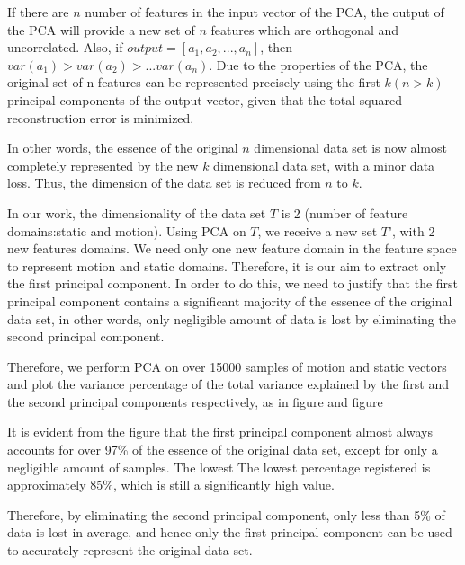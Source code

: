 If there are $n$ number of features in the input vector of the PCA, the output of the
PCA will provide a new set of $n$ features which are orthogonal and uncorrelated. Also, if
$output=[a_{1}, a_{2}, ..., a_{n}]$, then $var(a_{1})>var(a_{2})>...var(a_{n})$.
Due to the properties of the PCA, the original set of n features can be
represented precisely using the first $k(n>k)$ principal
components of the output vector, given that the total squared reconstruction error
is minimized.

In other words, the essence of the original $n$ dimensional data set is now almost
completely represented by the new $k$ dimensional data set, with a minor data loss. Thus, the
dimension of the data set is reduced from $n$ to $k$.


In our work, the dimensionality of the data set $T$ is 2 (number of feature domains:static
and motion).
Using PCA on $T$, we receive a new set $T’$, with 2 new features domains. We need only one new feature
domain in the feature space to
represent motion and static domains. Therefore, it is our aim to extract only the first principal component.
In order to do this, we need to justify that the first principal component contains a significant majority of
the essence of the original data set, in other words, only negligible amount of data is lost by
eliminating the second principal component.

Therefore, we perform PCA on over 15000 samples of motion and static
vectors and plot the variance percentage of the total variance
explained by the first and the second principal components respectively, as in figure and figure


It is evident from the figure that the first principal component almost always accounts
for over 97\% of the essence of the original data set, except for only a negligible amount
of samples. The lowest The lowest percentage registered is approximately 85\%, which is still a
significantly high value.

Therefore, by eliminating the second principal component, only less than 5\% of data
is lost in average, and hence only the first principal component can be used to accurately
represent the original data set. 